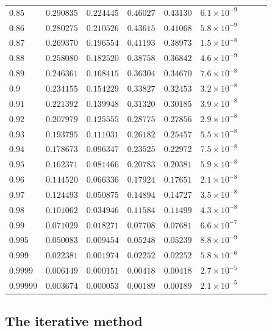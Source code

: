 \documentclass[12pt]{extarticle}
\theoremstyle{plain}
\theoremstyle{remark}
\begin{document}
\begin{longtable}{lcccccccc}
$0.85$ & $0.290835$ & $0.224445$ & $0.46027$ & $0.43130$ & $6.1\times10^{-9}$ \\
$0.86$ & $0.280275$ & $0.210526$ & $0.43615$ & $0.41068$ & $5.8\times10^{-9}$ \\
$0.87$ & $0.269370$ & $0.196554$ & $0.41193$ & $0.38973$ & $1.5\times10^{-8}$ \\
$0.88$ & $0.258080$ & $0.182520$ & $0.38758$ & $0.36842$ & $4.6\times10^{-9}$ \\
$0.89$ & $0.246361$ & $0.168415$ & $0.36304$ & $0.34670$ & $7.6\times10^{-8}$ \\
$0.9$ & $0.234155$ & $0.154229$ & $0.33827$ & $0.32453$ & $3.2\times10^{-8}$ \\
$0.91$ & $0.221392$ & $0.139948$ & $0.31320$ & $0.30185$ & $3.9\times10^{-8}$ \\
$0.92$ & $0.207979$ & $0.125555$ & $0.28775$ & $0.27856$ & $2.9\times10^{-8}$ \\
$0.93$ & $0.193795$ & $0.111031$ & $0.26182$ & $0.25457$ & $5.5\times10^{-8}$ \\
$0.94$ & $0.178673$ & $0.096347$ & $0.23525$ & $0.22972$ & $7.5\times10^{-8}$ \\
$0.95$ & $0.162371$ & $0.081466$ & $0.20783$ & $0.20381$ & $5.9\times10^{-8}$ \\
$0.96$ & $0.144520$ & $0.066336$ & $0.17924$ & $0.17651$ & $2.1\times10^{-8}$ \\
$0.97$ & $0.124493$ & $0.050875$ & $0.14894$ & $0.14727$ & $3.5\times10^{-8}$ \\
$0.98$ & $0.101062$ & $0.034946$ & $0.11584$ & $0.11499$ & $4.3\times10^{-8}$ \\
$0.99$ & $0.071029$ & $0.018271$ & $0.07708$ & $0.07681$ & $6.6\times10^{-7}$ \\
$0.995$ & $0.050083$ & $0.009454$ & $0.05248$ & $0.05239$ & $8.8\times10^{-9}$ \\
$0.999$ & $0.022381$ & $0.001974$ & $0.02252$ & $0.02252$ & $5.8\times10^{-6}$ \\
$0.9999$ & $0.006149$ & $0.000151$ & $0.00418$ & $0.00418$ & $2.7\times10^{-5}$ \\
$0.99999$ & $0.003674$ & $0.000053$ & $0.00189$ & $0.00189$ & $2.1\times10^{-5}$ \\
\end{longtable}

\clearpage
\subsection*{The iterative method}
\end{document}
